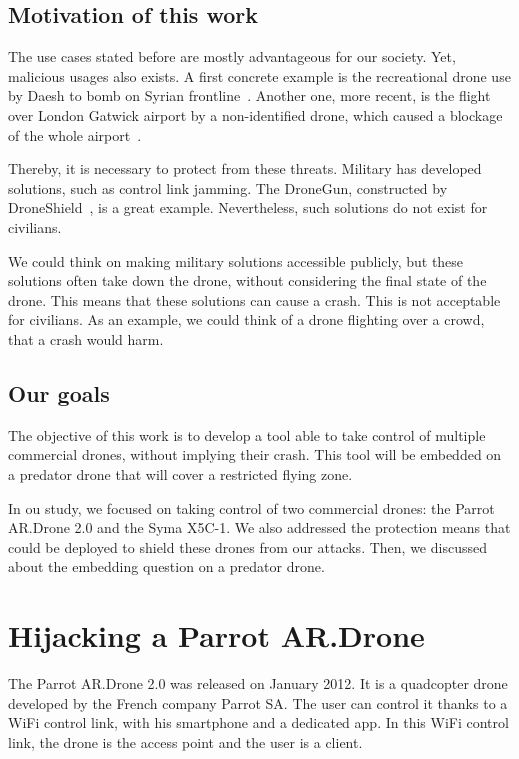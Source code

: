 \documentclass[conference,a4paper]{IEEEtran}
\begin{document}
\subsection{Motivation of this work}
The use cases stated before are mostly advantageous for our society. Yet, malicious usages
also exists. A first concrete example is the recreational drone use by Daesh to bomb on Syrian
frontline~\cite{bib:daesh}. Another one, more recent, is the flight over London Gatwick
airport by a non-identified drone, which caused a blockage of the whole
airport~\cite{bib:gatwick}.

Thereby, it is necessary to protect from these threats. Military has developed solutions,
such as control link jamming. The DroneGun, constructed by
DroneShield~\cite{bib:droneshield}, is a great example. Nevertheless, such solutions
do not exist for civilians.

We could think on making military solutions accessible publicly, but these solutions often
take down the drone, without considering the final state of the drone. This means that
these solutions can cause a crash. This is not acceptable for civilians. As an example, we
could think of a drone flighting over a crowd, that a crash would harm.

\subsection{Our goals}
The objective of this work is to develop a tool able to take control of multiple
commercial drones, without implying their crash. This tool will be embedded on a predator
drone that will cover a restricted flying zone.

In ou study, we focused on taking control of two commercial drones: the Parrot AR.Drone
2.0 and the Syma X5C-1. We also addressed the protection means that could be deployed to
shield these drones from our attacks. Then, we discussed about the embedding question on a
predator drone.



\section{Hijacking a Parrot AR.Drone}
The Parrot AR.Drone 2.0 was released on January 2012. It is a quadcopter drone developed
by the French company Parrot SA\@. The user can control it thanks to a WiFi control link,
with his smartphone and a dedicated app. In this WiFi control link, the drone is the
access point and the user is a client.
\end{document}
